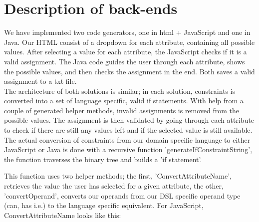 \documentclass[paper=a4, fontsize=11pt]{scrartcl} %
\numberwithin{equation}{section} %
\numberwithin{figure}{section} %
\numberwithin{table}{section} %
\begin{document}
\section{Description of back-ends}
We have implemented two code generators, one in html + JavaScript and one in Java. Our HTML consist of a dropdown for each attribute, containing all possible values. After selecting a value for each attribute, the JavaScript checks if it is a valid assignment. The Java code guides the user through each attribute, shows the possible values, and then checks the assignment in the end. Both saves a valid assignment to a txt file.\\

The architecture of both solutions is similar; in each solution, constraints is converted into a set of language specific, valid if statements. With help from a couple of generated helper methods, invalid assignments is removed from the possible values. The assignment is then validated by going through each attribute to check if there are still any values left and if the selected value is still available.\\
The actual conversion of constraints from our domain specific language to either JavaScript or Java is done with a recursive function 'generateIfConstraintString', the function traverses the binary tree and builds a 'if statement'. 



This function uses two helper methods; the first, 'ConvertAttributeName', retrieves the value the user has selected for a given attribute, the other, 'convertOperand', converts our operands from our DSL specific operand type (can, has i.e.) to the language specific equivalent.
For JavaScript, ConvertAttributeName looks like this:


\end{document}
